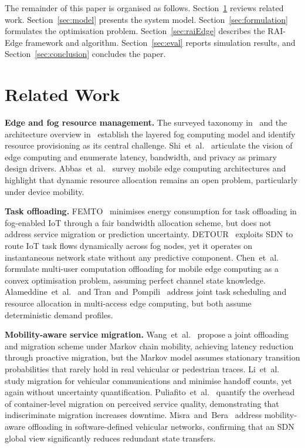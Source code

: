 \documentclass[conference]{IEEEtran}
\begin{document}
The remainder of this paper is organised as follows. Section~\ref{sec:related}
reviews related work. Section~\ref{sec:model} presents the system model.
Section~\ref{sec:formulation} formulates the optimisation problem.
Section~\ref{sec:raiEdge} describes the RAI-Edge framework and algorithm.
Section~\ref{sec:eval} reports simulation results, and
Section~\ref{sec:conclusion} concludes the paper.

\section{Related Work}
\label{sec:related}

\textbf{Edge and fog resource management.}
The surveyed taxonomy in~\cite{mahmud2018fog} and the architecture
overview in~\cite{hu2017survey} establish the layered fog computing
model and identify resource provisioning as its central challenge.
Shi~et~al.~\cite{shi2016edge} articulate the vision of edge computing
and enumerate latency, bandwidth, and privacy as primary design
drivers. Abbas~et~al.~\cite{abbas2018mobile} survey mobile edge
computing architectures and highlight that dynamic resource allocation
remains an open problem, particularly under device mobility.

\textbf{Task offloading.}
FEMTO~\cite{zhang2018femto} minimises energy consumption for task
offloading in fog-enabled IoT through a fair bandwidth allocation scheme,
but does not address service migration or prediction uncertainty.
DETOUR~\cite{misra2019detour} exploits SDN to route IoT task flows
dynamically across fog nodes, yet it operates on instantaneous network
state without any predictive component. Chen~et~al.~\cite{chen2016efficient}
formulate multi-user computation offloading for mobile edge computing
as a convex optimisation problem, assuming perfect channel state
knowledge. Alameddine~et~al.~\cite{alameddine2019dynamic} and
Tran~and~Pompili~\cite{tran2019joint} address joint task scheduling
and resource allocation in multi-access edge computing, but both
assume deterministic demand profiles.

\textbf{Mobility-aware service migration.}
Wang~et~al.~\cite{wang2019mobility} propose a joint offloading and
migration scheme under Markov chain mobility, achieving latency
reduction through proactive migration, but the Markov model assumes
stationary transition probabilities that rarely hold in real vehicular
or pedestrian traces. Li~et~al.~\cite{li2019service} study migration
for vehicular communications and minimise handoff counts, yet again
without uncertainty quantification. Puliafito~et~al.~\cite{puliafito2020impact}
quantify the overhead of container-level migration on perceived service
quality, demonstrating that indiscriminate migration increases downtime.
Misra~and~Bera~\cite{misra2019soft} address mobility-aware offloading in
software-defined vehicular networks, confirming that an SDN global view
significantly reduces redundant state transfers.
\end{document}
